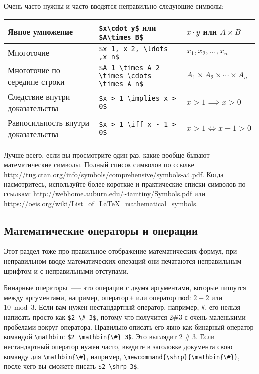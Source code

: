 \documentclass{article}
\begin{document}
    Очень часто нужны и часто вводятся неправильно следующие символы:
    \begin{table}[H]
        \begin{tabular}{|p{} | l  | l |}
            \hline
            Явное умножение               & \verb|$x\cdot y$| или \verb|$A\times B$|         & $x\cdot y$ или $A\times B$                \\
            \hline
            Многоточие                    & \verb|$x_1, x_2, \ldots ,x_n$|                   & $x_1, x_2, \ldots ,x_n$                   \\
            \hline
            Многоточие по середине строки & \verb|$A_1 \times A_2 \times \cdots \times A_n$| & $A_1 \times A_2 \times \cdots \times A_n$ \\
            \hline
            Следствие внутри доказательства & \verb|$x > 1 \implies x > 0$| & $x > 1 \implies x > 0$ \\
            \hline
            Равносильность внутри доказательства & \verb|$x > 1 \iff x - 1 > 0$| & $x > 1 \iff x - 1 > 0$ \\
            \hline
        \end{tabular}
    \end{table}

    Лучше всего, если вы просмотрите один раз, какие вообще бывают математические символы. Полный список символов
    по ссылке \url{http://tug.ctan.org/info/symbols/comprehensive/symbols-a4.pdf}.
    Когда насмотритесь, используйте более короткие и практические списки символов по ссылкам:
    \url{http://webhome.auburn.edu/~tamtiny/Symbols.pdf} или \url{https://oeis.org/wiki/List_of_LaTeX_mathematical_symbols}.

    \subsection{Математические операторы и операции}

    Этот раздел тоже про правильное отображение математических формул, при неправильном вводе
    математических операций они печатаются неправильным шрифтом и с неправильными отступами.

    Бинарные операторы~—-- это операции с двумя аргументами, которые пишутся между аргументами,
    например, оператор \verb|+| или оператор \verb|mod|: $2 + 2$ или $10 \bmod 3$. Если вам нужен
    нестандартный оператор, например, \verb|#|, его нельзя написать просто как \verb|$2 \# 3$|,
    потому что получится  $2 \# 3$ с очень маленькими пробелами вокруг оператора. Правильно
    описать его явно как бинарный оператор командой \verb|\mathbin|: \verb|$2 \mathbin{\#} 3$|.
    Это выглядит $2 \mathbin{\#} 3$. Если нестандартный оператор нужен часто, введите в заголовке
    документа свою команду для \verb|\mathbin{\#}|, например, \verb|\newcommand{\shrp}{\mathbin{\#}}|,
    после чего вы сможете писать \verb|$2 \shrp 3$|.
\end{document}
